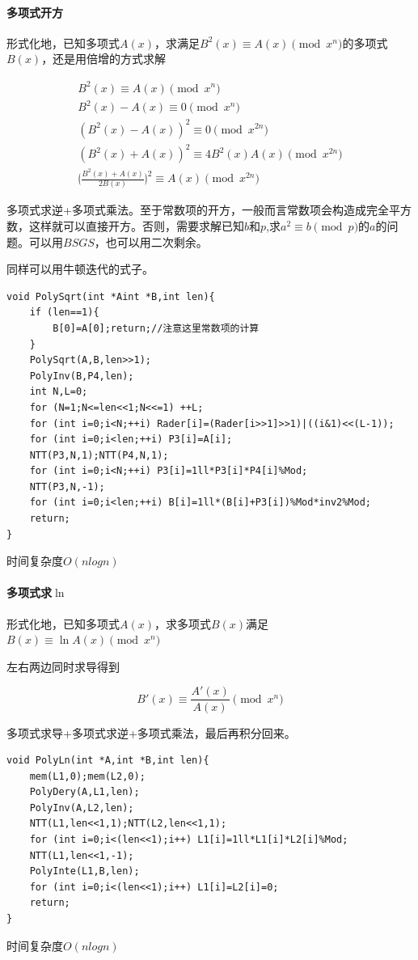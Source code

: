 \documentclass[UTF-8]{ctexart}
\begin{document}
	\paragraph{多项式开方} 形式化地，已知多项式$A(x)$，求满足$B^2(x) \equiv A(x) \pmod{x^n}$的多项式$B(x)$，还是用倍增的方式求解
	
	\begin{align}
	B^2(x) \equiv A(x) \pmod{x^n} \nonumber\\ B^2(x)-A(x) \equiv 0 \pmod {x^n} \nonumber\\ (B^2(x)-A(x))^2 \equiv 0 \pmod{x^{2n}} \nonumber\\ (B^2(x)+A(x))^2 \equiv 4B^2(x)A(x) \pmod{x^{2n}} \nonumber\\ \lgroup \frac{B^2(x)+A(x)}{2B(x)} \rgroup ^2 \equiv A(x) \pmod{x^{2n}}\nonumber
	\end{align}
	
	多项式求逆+多项式乘法。至于常数项的开方，一般而言常数项会构造成完全平方数，这样就可以直接开方。否则，需要求解已知$b$和$p$,求$a^2 \equiv b \pmod{p}$的$a$的问题。可以用$BSGS$，也可以用二次剩余。
	
	同样可以用牛顿迭代的式子。
	
\begin{verbatim}
void PolySqrt(int *Aint *B,int len){
    if (len==1){
        B[0]=A[0];return;//注意这里常数项的计算
    }
    PolySqrt(A,B,len>>1);
    PolyInv(B,P4,len);
    int N,L=0;
    for (N=1;N<=len<<1;N<<=1) ++L;
    for (int i=0;i<N;++i) Rader[i]=(Rader[i>>1]>>1)|((i&1)<<(L-1));
    for (int i=0;i<len;++i) P3[i]=A[i];
    NTT(P3,N,1);NTT(P4,N,1);
    for (int i=0;i<N;++i) P3[i]=1ll*P3[i]*P4[i]%Mod;
    NTT(P3,N,-1);
    for (int i=0;i<len;++i) B[i]=1ll*(B[i]+P3[i])%Mod*inv2%Mod;
    return;
}
\end{verbatim}
	
	时间复杂度$O(nlogn)$
	
	\paragraph{多项式求$\ln$} 形式化地，已知多项式$A(x)$，求多项式$B(x)$满足$B(x) \equiv \ln{A(x)} \pmod{x^n}$  
	
	左右两边同时求导得到
	
	$$B'(x) \equiv \frac{A'(x)}{A(x)} \pmod{x^n}$$
	
	多项式求导+多项式求逆+多项式乘法，最后再积分回来。
	
\begin{verbatim}
void PolyLn(int *A,int *B,int len){
    mem(L1,0);mem(L2,0);
    PolyDery(A,L1,len);
    PolyInv(A,L2,len);
    NTT(L1,len<<1,1);NTT(L2,len<<1,1);
    for (int i=0;i<(len<<1);i++) L1[i]=1ll*L1[i]*L2[i]%Mod;
    NTT(L1,len<<1,-1);
    PolyInte(L1,B,len);
    for (int i=0;i<(len<<1);i++) L1[i]=L2[i]=0;
    return;
}
\end{verbatim}
	时间复杂度$O(nlogn)$
	
\end{document}
